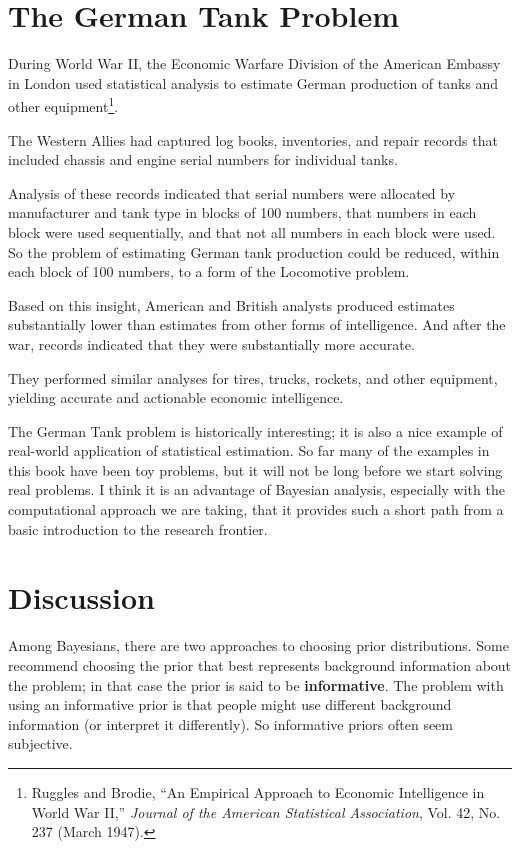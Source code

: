 \documentclass[12pt]{book}
\begin{document}
\section{The German Tank Problem}

During World War II, the Economic Warfare Division of the American
Embassy in London used statistical analysis to estimate German
production of tanks and other equipment\footnote{Ruggles and Brodie,
  ``An Empirical Approach to Economic Intelligence in World War II,''
  {\em Journal of the American Statistical Association}, Vol. 42,
  No. 237 (March 1947).}.

The Western Allies had captured log books, inventories, and repair
records that included chassis and engine serial numbers for individual
tanks.

Analysis of these records indicated that serial numbers were allocated
by manufacturer and tank type in blocks of 100 numbers, that numbers
in each block were used sequentially, and that not all numbers in each
block were used.  So the problem of estimating German tank production
could be reduced, within each block of 100 numbers, to a form of the
Locomotive problem.

Based on this insight, American and British analysts produced
estimates substantially lower than estimates from other forms
of intelligence.  And after the war, records indicated that they were
substantially more accurate.

They performed similar analyses for tires, trucks, rockets, and other
equipment, yielding accurate and actionable economic intelligence.

The German Tank problem is historically interesting; it is also a nice
example of real-world application of statistical estimation.  So far
many of the examples in this book have been toy problems, but it will
not be long before we start solving real problems.  I think it is an
advantage of Bayesian analysis, especially with the computational
approach we are taking, that it provides such a short path from a
basic introduction to the research frontier.


\section{Discussion}

Among Bayesians, there are two approaches to choosing prior
distributions.  Some recommend choosing the prior that best represents
background information about the problem; in that case the prior
is said to be {\bf informative}.  The problem with using an informative
prior is that people might use different background information (or
interpret it differently).  So informative priors often seem subjective.
\end{document}
